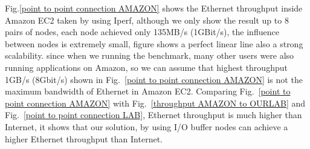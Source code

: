 

Fig.\ref{point to point connection AMAZON} shows the Ethernet throughput inside Amazon EC2 taken by using Iperf, although we only show the result up to 8 pairs of nodes, each node achieved only 135MB/s (1GBit/s), the influence between nodes is extremely small, figure shows a perfect linear line also a strong scalability.
since when we running the benchmark, many other users were also running applications on Amazon, so we can assume that highest throughput 1GB/s (8Gbit/s) shown in Fig.~\ref{point to point connection AMAZON} is not the maximum bandwidth of Ethernet in Amazon EC2.
Comparing Fig.~\ref{point to point connection AMAZON} with Fig.~\ref{throughput AMAZON to OURLAB} and Fig.~\ref{point to point connection LAB}, Ethernet throughput is much higher than Internet, it shows that our solution, by using I/O buffer nodes can achieve a higher Ethernet throughput than Internet.

